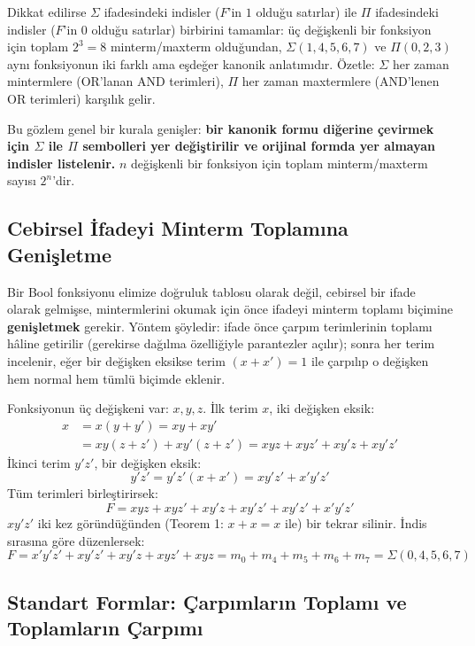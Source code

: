 Dikkat edilirse $\Sigma$ ifadesindeki indisler ($F$'in $1$ olduğu satırlar) ile $\Pi$
ifadesindeki indisler ($F$'in $0$ olduğu satırlar) birbirini tamamlar: üç değişkenli bir
fonksiyon için toplam $2^3=8$ minterm/maxterm olduğundan, $\Sigma(1,4,5,6,7)$ ve
$\Pi(0,2,3)$ aynı fonksiyonun iki farklı ama eşdeğer kanonik anlatımıdır. Özetle:
$\Sigma$ her zaman mintermlere (OR'lanan AND terimleri), $\Pi$ her zaman maxtermlere
(AND'lenen OR terimleri) karşılık gelir.

Bu gözlem genel bir kurala genişler: \textbf{bir kanonik formu diğerine çevirmek için
$\Sigma$ ile $\Pi$ sembolleri yer değiştirilir ve orijinal formda yer almayan indisler
listelenir.} $n$ değişkenli bir fonksiyon için toplam minterm/maxterm sayısı $2^n$'dir.

\subsection{Cebirsel İfadeyi Minterm Toplamına Genişletme}
\label{sec:cebirsel-genisletme}

Bir Bool fonksiyonu elimize doğruluk tablosu olarak değil, cebirsel bir ifade olarak
gelmişse, mintermlerini okumak için önce ifadeyi minterm toplamı biçimine
\textbf{genişletmek} gerekir. Yöntem şöyledir: ifade önce çarpım terimlerinin toplamı
hâline getirilir (gerekirse dağılma özelliğiyle parantezler açılır); sonra her terim
incelenir, eğer bir değişken eksikse terim $(x+x')=1$ ile çarpılıp o değişken hem normal
hem tümlü biçimde eklenir.

\begin{ornek}[$F=x+y'z'$ İfadesini Minterm Toplamına Genişletme]
Fonksiyonun üç değişkeni var: $x,y,z$. İlk terim $x$, iki değişken eksik:
\begin{align*}
x &= x(y+y') = xy+xy'\\
  &= xy(z+z')+xy'(z+z') = xyz+xyz'+xy'z+xy'z'
\end{align*}
İkinci terim $y'z'$, bir değişken eksik:
\[
y'z' = y'z'(x+x') = xy'z'+x'y'z'
\]
Tüm terimleri birleştirirsek:
\[
F = xyz+xyz'+xy'z+xy'z'+xy'z'+x'y'z'
\]
$xy'z'$ iki kez göründüğünden (Teorem 1: $x+x=x$ ile) bir tekrar silinir. İndis sırasına
göre düzenlersek:
\[
F = x'y'z'+xy'z'+xy'z+xyz'+xyz = m_0+m_4+m_5+m_6+m_7 = \Sigma(0,4,5,6,7)
\]
\end{ornek}

\subsection{Standart Formlar: Çarpımların Toplamı ve Toplamların Çarpımı}
\label{sec:standart-formlar}

